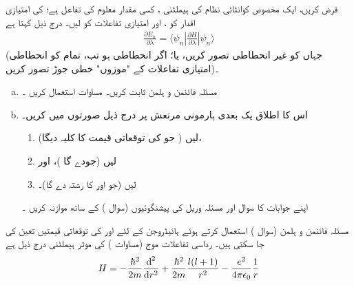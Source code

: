 فرض کریں،  ایک مخصوص کوانٹائی نظام کی  ہیملٹنی  ،  کسی مقدار معلوم     کی  تفاعل ہے؛ کی  امتیازی اقدار کو ،   اور امتیازی تفاعلات کو   لیں۔      درج ذیل کہتا ہے
\begin{align}\label{مساوات_غیر_مضطرب_مسئلہ_فائنمن}
\frac{\partial E_{n}}{\partial \lambda}=\big\langle{\psi_{n}|\frac{\partial{H}}{\partial{\lambda}}|\psi_{n}}\big\rangle
\end{align}
(جہاں   کو غیر انحطاطی تصور کریں،  یا؛ اگر انحطاطی ہو تب،  تمام کو انحطاطی امتیازی تفاعلات کے "موزوں" خطی جوڑ تصور کریں)۔
\begin{enumerate}[a.]
\item
   مسئلہ فائنمن و ہلمن    ثابت کریں۔   مساوات  استعمال کریں ۔ 
\item
  اس کا اطلاق یک بعدی  ہارمونی  مرتعش   پر  درج ذیل   صورتوں میں کریں۔
\begin{enumerate}[1.]  
\item
  لیں ( جو  کی توقعاتی قیمت کا کلیہ دیگا)، 
  \item
  لیں (جودے گا )، اور
  \item
  لیں (جو اور کا  رشتہ دے گا)۔
 \end{enumerate}
    اپنے جوابات کا سوال اور مسئلہ  وریل   کی پیشنگوئیوں  (سوال )   کے ساتھ موازنہ  کریں ۔
 \end{enumerate}
مسئلہ فائنمن و ہلمن (سوال )  استعمال کرتے ہوئے ہائیڈروجن کے  لئے   اور   کی توقعاتی قیمتیں تعین  کی جا سکتی ہیں۔  رداسی تفاعلات موج    (مساوات ) کی  موثر  ہیملٹنی  درج ذیل ہے 
\begin{align*}
H=-\frac{\hslash^{2}}{2m}\frac{\dif^{\,2}}{\dif r^{2}}+\frac{\hslash^{2}}{2m}\frac{l(l+1)}{r^{2}}-\frac{e^{2}}{4\pi\epsilon_0}\frac{1}{r}
\end{align*}
